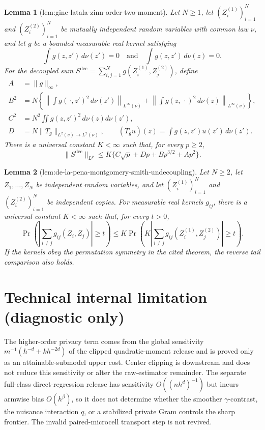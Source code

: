 \documentclass{article}
\newtheorem{lemma}{Lemma}
\begin{document}
\begin{lemma}[lem:gine-latala-zinn-order-two-moment]\label{lem:gine-latala-zinn-order-two-moment}
Let \(N\geq1\), let \((Z_i^{(1)})_{i=1}^N\) and \((Z_i^{(2)})_{i=1}^N\) be mutually independent random variables with common law \(\nu\), and let \(g\) be a bounded measurable real kernel satisfying
\[
 \int g(z,z')\,d\nu(z')=0
 \quad\text{and}\quad
 \int g(z,z')\,d\nu(z)=0.
\]
For the decoupled sum \(S^{\mathrm{dec}}=\sum_{i,j=1}^N g(Z_i^{(1)},Z_j^{(2)})\), define
\[
 \begin{aligned}
 A&=\|g\|_\infty,\\
 B^2&=N\left\{\left\|\int g(\,\cdot,z')^2\,d\nu(z')\right\|_{L^\infty(\nu)}
              +\left\|\int g(z,\,\cdot)^2\,d\nu(z)\right\|_{L^\infty(\nu)}\right\},\\
 C^2&=N^2\iint g(z,z')^2\,d\nu(z)d\nu(z'),\\
 D&=N\|T_g\|_{L^2(\nu)\to L^2(\nu)},
 \qquad (T_gu)(z)=\int g(z,z')u(z')\,d\nu(z').
 \end{aligned}
\]
There is a universal constant \(K<\infty\) such that, for every \(p\geq2\),
\[
 \|S^{\mathrm{dec}}\|_{L^p}
 \leq K\{C\sqrt p+Dp+Bp^{3/2}+Ap^2\}.
\]
\end{lemma}

\begin{lemma}[lem:de-la-pena-montgomery-smith-undecoupling]\label{lem:de-la-pena-montgomery-smith-undecoupling}
Let \(N\geq2\), let \(Z_1,\ldots,Z_N\) be independent random variables, and let \((Z_i^{(1)})_{i=1}^N\) and \((Z_i^{(2)})_{i=1}^N\) be independent copies.  For measurable real kernels \(g_{ij}\), there is a universal constant \(K<\infty\) such that, for every \(t>0\),
\[
 \Pr\!\left(\left|\sum_{i\ne j}g_{ij}(Z_i,Z_j)\right|\geq t\right)
 \leq K\Pr\!\left(K\left|\sum_{i\ne j}g_{ij}(Z_i^{(1)},Z_j^{(2)})\right|\geq t\right).
\]
If the kernels obey the permutation symmetry in the cited theorem, the reverse tail comparison also holds.
\end{lemma}

\section*{Technical internal limitation (diagnostic only)}

The higher-order privacy term comes from the global sensitivity \(m^{-1}(h^{-d}+kh^{-2d})\) of the clipped quadratic-moment release and is proved only as an attainable-submodel upper cost.  Center clipping is downstream and does not reduce this sensitivity or alter the raw-estimator remainder.  The separate full-class direct-regression release has sensitivity \(O((nh^d)^{-1})\) but incurs armwise bias \(O(h^\beta)\), so it does not determine whether the smoother \(\gamma\)-contrast, the nuisance interaction \(q\), or a stabilized private Gram controls the sharp frontier.  The invalid paired-microcell transport step is not revived.
\end{document}
